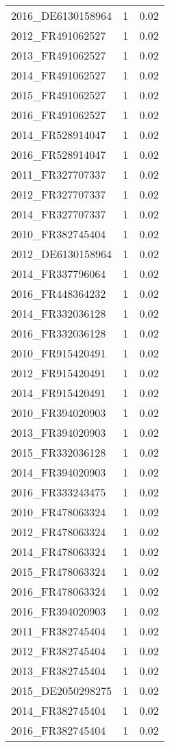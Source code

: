 \begin{table*}[htbp]
\begin{tabular}{lrr}
2016_DE6130158964 & 1 & 0.02 \\
2012_FR491062527 & 1 & 0.02 \\
2013_FR491062527 & 1 & 0.02 \\
2014_FR491062527 & 1 & 0.02 \\
2015_FR491062527 & 1 & 0.02 \\
2016_FR491062527 & 1 & 0.02 \\
2014_FR528914047 & 1 & 0.02 \\
2016_FR528914047 & 1 & 0.02 \\
2011_FR327707337 & 1 & 0.02 \\
2012_FR327707337 & 1 & 0.02 \\
2014_FR327707337 & 1 & 0.02 \\
2010_FR382745404 & 1 & 0.02 \\
2012_DE6130158964 & 1 & 0.02 \\
2014_FR337796064 & 1 & 0.02 \\
2016_FR448364232 & 1 & 0.02 \\
2014_FR332036128 & 1 & 0.02 \\
2016_FR332036128 & 1 & 0.02 \\
2010_FR915420491 & 1 & 0.02 \\
2012_FR915420491 & 1 & 0.02 \\
2014_FR915420491 & 1 & 0.02 \\
2010_FR394020903 & 1 & 0.02 \\
2013_FR394020903 & 1 & 0.02 \\
2015_FR332036128 & 1 & 0.02 \\
2014_FR394020903 & 1 & 0.02 \\
2016_FR333243475 & 1 & 0.02 \\
2010_FR478063324 & 1 & 0.02 \\
2012_FR478063324 & 1 & 0.02 \\
2014_FR478063324 & 1 & 0.02 \\
2015_FR478063324 & 1 & 0.02 \\
2016_FR478063324 & 1 & 0.02 \\
2016_FR394020903 & 1 & 0.02 \\
2011_FR382745404 & 1 & 0.02 \\
2012_FR382745404 & 1 & 0.02 \\
2013_FR382745404 & 1 & 0.02 \\
2015_DE2050298275 & 1 & 0.02 \\
2014_FR382745404 & 1 & 0.02 \\
2016_FR382745404 & 1 & 0.02 \\

\end{tabular}
\end{table*}
